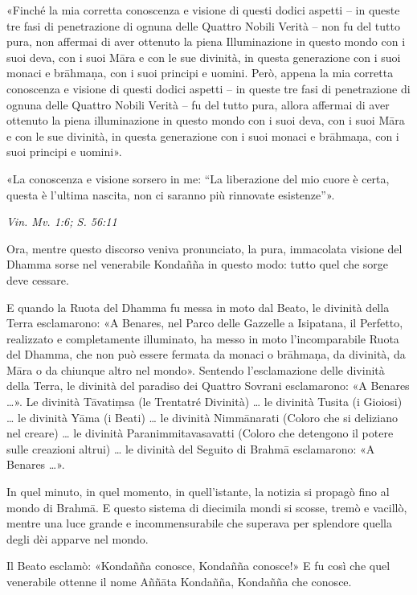 «Finché la mia corretta conoscenza e visione di questi dodici aspetti –
in queste tre fasi di penetrazione di ognuna delle Quattro Nobili Verità
– non fu del tutto pura, non affermai di aver ottenuto la piena
Illuminazione in questo mondo con i suoi deva, con i suoi Māra e con le
sue divinità, in questa generazione con i suoi monaci e brāhmaṇa, con i
suoi principi e uomini. Però, appena la mia corretta conoscenza e
visione di questi dodici aspetti – in queste tre fasi di penetrazione di
ognuna delle Quattro Nobili Verità – fu del tutto pura, allora affermai
di aver ottenuto la piena illuminazione in questo mondo con i suoi deva,
con i suoi Māra e con le sue divinità, in questa generazione con i suoi
monaci e brāhmaṇa, con i suoi principi e uomini».


«La conoscenza e visione sorsero in me: “La liberazione del mio cuore è
certa, questa è l’ultima nascita, non ci saranno più rinnovate
esistenze”».


\emph{Vin. Mv. 1:6; S. 56:11}


Ora, mentre questo discorso veniva pronunciato, la pura, immacolata
visione del Dhamma sorse nel venerabile Kondañña in questo modo: tutto
quel che sorge deve cessare.


E quando la Ruota del Dhamma fu messa in moto dal Beato, le divinità
della Terra esclamarono: «A Benares, nel Parco delle Gazzelle a
Isipatana, il Perfetto, realizzato e completamente illuminato, ha messo
in moto l’incomparabile Ruota del Dhamma, che non può essere fermata da
monaci o brāhmaṇa, da divinità, da Māra o da chiunque altro nel mondo».
Sentendo l’esclamazione delle divinità della Terra, le divinità del
paradiso dei Quattro Sovrani esclamarono: «A Benares …​». Le divinità
Tāvatiṃsa (le Trentatré Divinità) …​ le divinità Tusita (i Gioiosi) …​
le divinità Yāma (i Beati) …​ le divinità Nimmānarati (Coloro che si
deliziano nel creare) …​ le divinità Paranimmitavasavatti (Coloro che
detengono il potere sulle creazioni altrui) …​ le divinità del Seguito
di Brahmā esclamarono: «A Benares …​».


In quel minuto, in quel momento, in quell’istante, la notizia si propagò
fino al mondo di Brahmā. E questo sistema di diecimila mondi si scosse,
tremò e vacillò, mentre una luce grande e incommensurabile che superava
per splendore quella degli dèi apparve nel mondo.


Il Beato esclamò: «Kondañña conosce, Kondañña conosce!» E fu così che
quel venerabile ottenne il nome Aññāta Kondañña, Kondañña che conosce.


